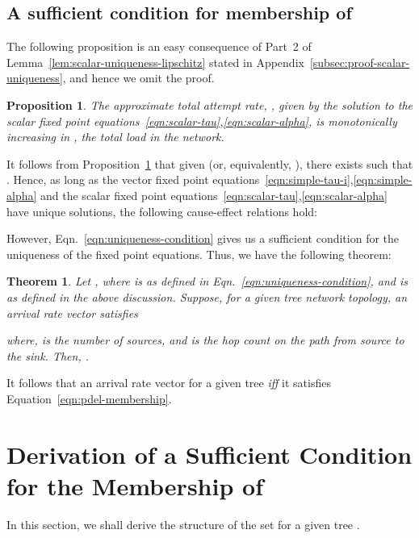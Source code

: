 \documentclass[12pt, draftclsnofoot, onecolumn]{IEEEtran}
\newtheorem{theorem}{Theorem}
\newtheorem{proposition}{Proposition}
\begin{document}
\subsection{A sufficient condition for membership of }
\label{subsec:sufficient-cond-Lambda-delta}
The following proposition is an easy consequence of Part~2 of Lemma~\ref{lem:scalar-uniqueness-lipschitz} stated in Appendix~\ref{subsec:proof-scalar-uniqueness}, and hence we omit the proof.

\begin{proposition}
\label{prop:tau-inc-total-load}
The approximate total attempt rate, , given by the solution to the scalar fixed point equations~\eqref{eqn:scalar-tau},\eqref{eqn:scalar-alpha}, is monotonically increasing in , the total load in the network.
\end{proposition}

It follows from Proposition~\ref{prop:tau-inc-total-load} that given  (or, equivalently, ), there exists  such that . Hence, as long as the vector fixed point equations~\eqref{eqn:simple-tau-i},\eqref{eqn:simple-alpha} and the scalar fixed point equations~\eqref{eqn:scalar-tau},\eqref{eqn:scalar-alpha} have unique solutions, the following cause-effect relations hold:


However, Eqn.~\eqref{eqn:uniqueness-condition} gives us a sufficient condition for the uniqueness of the fixed point equations. Thus, we have the following theorem:

\begin{theorem}
\label{thm:membership-Lambda-delta}
Let , where  is as defined in Eqn.~\eqref{eqn:uniqueness-condition}, and  is as defined in the above discussion. Suppose, for a given tree network topology, an arrival rate vector  satisfies 

where,  is the number of sources, and  is the hop count on the path from source  to the sink. Then, .
\end{theorem}

It follows that an arrival rate vector  for a given tree  \emph{iff} it satisfies Equation~\eqref{eqn:pdel-membership}.

\section{Derivation of a Sufficient Condition for the Membership of }
\label{sec:arguments-leading-to-thm3}

In this section, we shall derive the structure of the set  for a given tree . 
\end{document}

